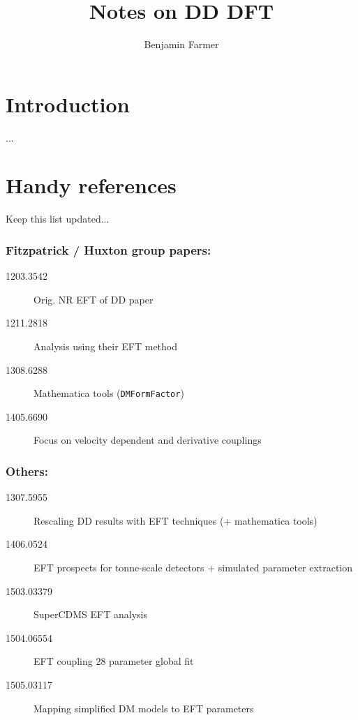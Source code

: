 \documentclass[a4paper]{article}	%
\begin{document}
\title{Notes on DD DFT}

\author{Benjamin Farmer} 

\date{}

\maketitle

\abstract{}

\tableofcontents

\section{Introduction}

...

\section{Handy references}

Keep this list updated...

\subsubsection*{Fitzpatrick / Huxton group papers:}
\begin{description}
    \item[1203.3542\cite{Fitzpatrick2012a}] Orig. NR EFT of DD paper
    \item[1211.2818\cite{Fitzpatrick2012}] Analysis using their EFT method
    \item[1308.6288\cite{Anand2014b}] Mathematica tools (\texttt{DMFormFactor}) 
    \item[1405.6690\cite{Anand2014a}] Focus on velocity dependent and derivative couplings
\end{description}

\subsubsection*{Others:}
\begin{description}
    \item[1307.5955\cite{Cirelli2013}] Rescaling DD results with EFT techniques (+ mathematica tools)
    \item[1406.0524\cite{Catena2014}] EFT prospects for tonne-scale detectors + simulated parameter extraction
    \item[1503.03379\cite{Schneck2015}] SuperCDMS EFT analysis
    \item[1504.06554\cite{Catena2015}] EFT coupling 28 parameter global fit
    \item[1505.03117\cite{Dent2015}] Mapping simplified DM models to EFT parameters
\end{description}
\end{document}
